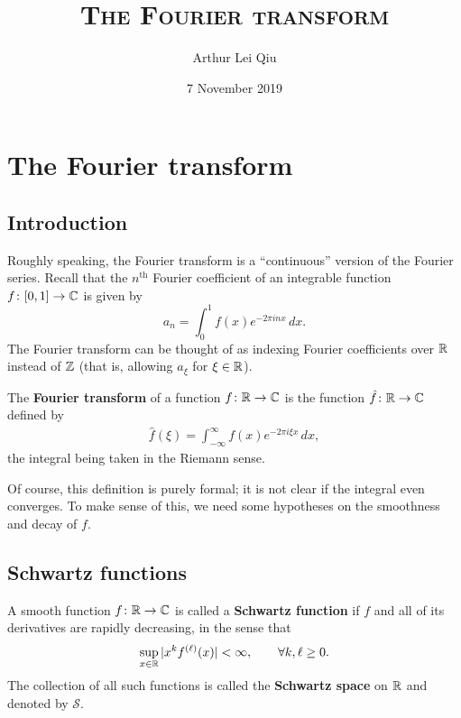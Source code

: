 \documentclass[11pt, letterpaper]{aq-notes}
\title{\scshape The Fourier transform}
\author{Arthur Lei Qiu}
\date{7 November 2019}
\newcommand{\schwartz}{\mathcal{S}}
\begin{document}
\maketitle

\section{The Fourier transform}

\subsection{Introduction}

Roughly speaking, the Fourier transform is a ``continuous'' version of the Fourier series. Recall that the $n^\text{th}$ Fourier coefficient of an integrable function $f \colon [0, 1] \to \mathbb{C}$ is given by
\[
	a_n = \int_0^1 f(x)e^{-2\pi inx}\,dx.
\]
The Fourier transform can be thought of as indexing Fourier coefficients over $\mathbb{R}$ instead of $\mathbb{Z}$ (that is, allowing $a_\xi$ for $\xi \in \mathbb{R}$).

\begin{definition}
	The \textbf{Fourier transform} of a function $f \colon \mathbb{R} \to \mathbb{C}$ is the function $\hat{f} \colon \mathbb{R} \to \mathbb{C}$ defined by
	\begin{align}\label{eq:ftransform}
		\hat{f}(\xi) = \int_{-\infty}^\infty f(x)e^{-2\pi i\xi x}\,dx,
	\end{align}
	the integral being taken in the Riemann sense.
\end{definition}
Of course, this definition is purely formal; it is not clear if the integral even converges. To make sense of this, we need some hypotheses on the smoothness and decay of $f$.

\subsection{Schwartz functions}

\begin{definition}
	A smooth function $f \colon \mathbb{R} \to \mathbb{C}$ is called a \textbf{Schwartz function} if $f$ and all of its derivatives are rapidly decreasing, in the sense that
	\begin{align}\label{eq:rapid-dec}
		\sup_{x \in \mathbb{R}} |x^kf^{(\ell)}(x)| < \infty, \qquad \forall k, \ell \geq 0.
	\end{align}
	The collection of all such functions is called the \textbf{Schwartz space} on $\mathbb{R}$ and denoted by $\schwartz$.
\end{definition}
\end{document}
